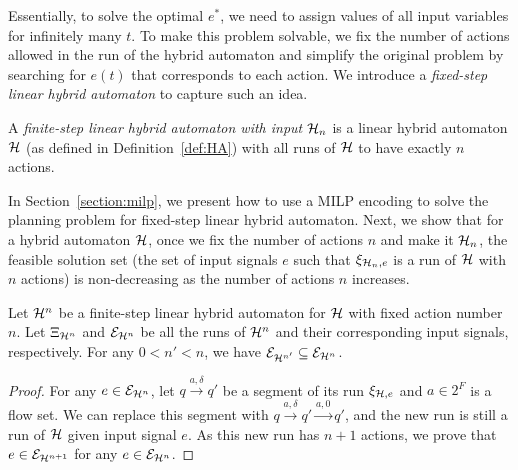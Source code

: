 \documentclass[sigconf]{acmart}
\begin{document}
Essentially, to solve the optimal $e^*$, we need to assign values of all input variables for infinitely many $t$. To make this problem solvable, we fix the number of actions allowed in the run of the hybrid automaton and simplify the original problem by searching for $e(t)$ that corresponds to each action. We introduce a {\em fixed-step linear hybrid automaton} to capture such an idea.

\begin{definition}
A {\em finite-step linear hybrid automaton with input} $\mathcal{H}_n$ is a linear hybrid automaton $\mathcal{H}$ (as defined in Definition~\ref{def:HA}) with all runs of $\mathcal{H}$ to have exactly $n$ actions.
\end{definition}


In Section~\ref{section:milp}, we present how to use a MILP encoding to solve the planning problem for fixed-step linear hybrid automaton. Next, we show that for a hybrid automaton $\mathcal{H}$, once we fix the number of actions $n$ and make it $\mathcal{H}_n$, the feasible solution set (the set of input signals $e$ such that $\xi_{\mathcal{H}_n, e}$ is a run of $\mathcal{H}$ with $n$ actions) is non-decreasing as the number of actions $n$ increases.

\begin{lemma}\label{lemma:step}
Let $\mathcal{H}^n$ be a finite-step linear hybrid automaton for $\mathcal{H}$ with fixed action number $n$. Let $\Xi_{\mathcal{H}^n}$ and $\mathcal{E}_{\mathcal{H}^n}$ be all the runs of $\mathcal{H}^n$ and their corresponding input signals, respectively. For any $0 < n' < n$, we have $\mathcal{E}_{\mathcal{H}^{n'}} \subseteq \mathcal{E}_{\mathcal{H}^n}$.
\end{lemma}

\begin{proof}
For any $e \in \mathcal{E}_{\mathcal{H}^n}$, let $ q \xrightarrow{a, \delta} q'$ be a segment of its run $\xi_{\mathcal{H}, e}$ and $a \in 2^F$ is a flow set. We can replace this segment with $q \xrightarrow{a, \delta} q' \xrightarrow{a, 0} q'$, and the new run is still a run of $\mathcal{H}$ given input signal $e$. As this new run has $n+1$ actions, we prove that $e \in \mathcal{E}_{\mathcal{H}^{n+1}}$ for any $e \in \mathcal{E}_{\mathcal{H}^{n}}$.
\end{proof}
\end{document}
